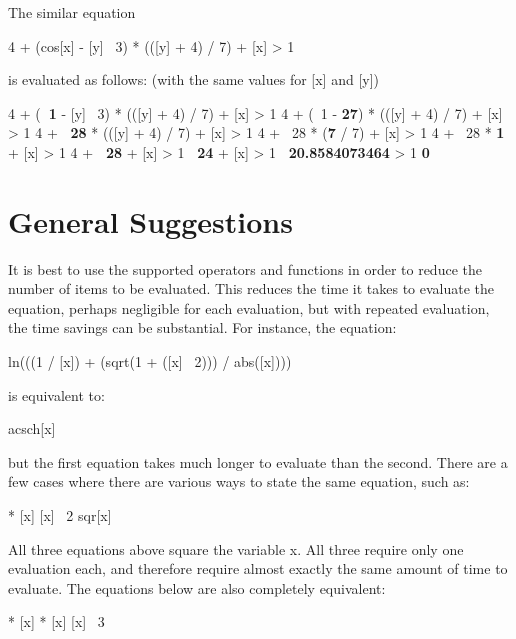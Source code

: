 The similar equation 

\begin{example}
4 + (cos[x] - [y] \circflex\ 3) * (([y] + 4) / 7) + [x] > 1 
\end{example}

is evaluated as follows: (with the same values for [x] and [y]) 

\begin{example}
4 + (\textbf{~1} - [y] \circflex\ 3) * (([y] + 4) / 7) + [x] > 1
4 + (~1 - \textbf{27}) * (([y] + 4) / 7) + [x] > 1
4 + \textbf{~28} * (([y] + 4) / 7) + [x] > 1
4 + ~28 * (\textbf{7} / 7) + [x] > 1
4 + ~28 * \textbf{1} + [x] > 1
4 + \textbf{~28} + [x] > 1
\textbf{~24} + [x] > 1
\textbf{~20.8584073464} > 1
\textbf{0} 
\end{example}

\section{General Suggestions}

It is best to use the supported operators and functions in order to
reduce the number of items to be evaluated. This reduces the time it
takes to evaluate the equation, perhaps negligible for each
evaluation, but with repeated evaluation, the time savings can be
substantial. For instance, the equation:

\begin{example}
ln(((1 / [x]) + (sqrt(1 + ([x] \circflex\ 2))) / abs([x]))) 
\end{example}

is equivalent to: 

\begin{example}
acsch[x] 
\end{example}

but the first equation takes much longer to evaluate than the second.
There are a few cases where there are various ways to state the same
equation, such as:

\begin{example}
[x] * [x]
[x] \circflex\ 2
sqr[x] 
\end{example}

All three equations above square the variable x. All three require
only one evaluation each, and therefore require almost exactly the
same amount of time to evaluate. The equations below are also
completely equivalent:

\begin{example}
[x] * [x] * [x]
[x] \circflex\ 3 
\end{example}

